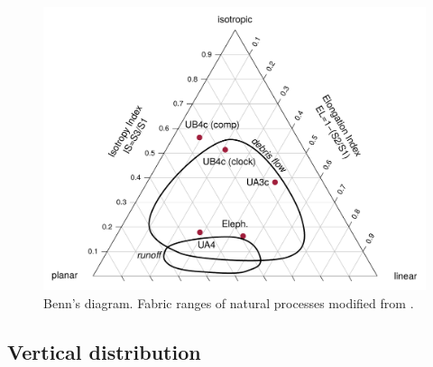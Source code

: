 \documentclass[preprint,authoryear,times]{elsarticle} %
\begin{document}
\begin{figure}[]
  \centering
  \includegraphics[width=1\textwidth]{../artwork/Fig8.pdf}
  \caption{Benn's diagram. Fabric ranges of natural processes modified from \cite{Lenoble2004}.}
  \label{fig:8}
\end{figure}

\subsection{Vertical distribution}


\end{document}
